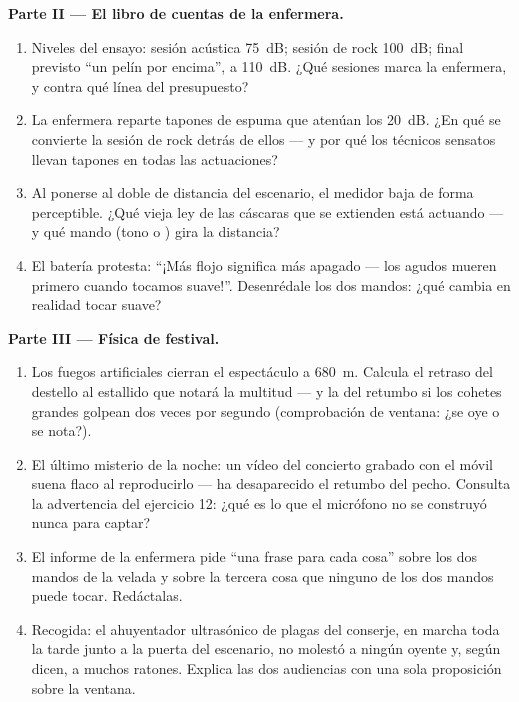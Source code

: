 \begin{problem}
\medskip\noindent\textbf{Parte II --- El libro de cuentas de la
enfermera.}
\begin{enumerate}[resume]
  \item Niveles del ensayo: sesión acústica \qty{75}{dB}; sesión de
        rock \qty{100}{dB}; final previsto ``un pelín por encima'',
        a \qty{110}{dB}. ¿Qué sesiones marca la enfermera, y contra
        qué línea del presupuesto?
  \item La enfermera reparte tapones de espuma que atenúan los
         \qty{20}{dB}. ¿En qué se convierte la sesión de
        rock detrás de ellos --- y por qué los técnicos sensatos
        llevan tapones en todas las actuaciones?
  \item Al ponerse al doble de distancia del escenario, el medidor
        baja de forma perceptible. ¿Qué vieja ley de las cáscaras
        que se extienden está actuando --- y qué mando (tono o
        ) gira la distancia?
  \item El batería protesta: ``¡Más flojo significa más apagado ---
        los agudos mueren primero cuando tocamos suave!''. Desenrédale
        los dos mandos: ¿qué cambia en realidad tocar suave?
\end{enumerate}

\medskip\noindent\textbf{Parte III --- Física de festival.}
\begin{enumerate}[resume]
  \item Los fuegos artificiales cierran el espectáculo a
        \qty{680}{m}. Calcula el retraso del destello al estallido
        que notará la multitud --- y la  del retumbo
        si los cohetes grandes golpean dos veces por segundo
        (comprobación de ventana: ¿se oye o se nota?).
  \item El último misterio de la noche: un vídeo del concierto
        grabado con el móvil suena flaco al reproducirlo --- ha
        desaparecido el retumbo del pecho. Consulta la advertencia
        del ejercicio 12: ¿qué es lo que el micrófono no se
        construyó nunca para captar?
  \item El informe de la enfermera pide ``una frase para cada
        cosa'' sobre los dos mandos de la velada y sobre la tercera
        cosa que ninguno de los dos mandos puede tocar. Redáctalas.
  \item Recogida: el ahuyentador ultrasónico de plagas del
        conserje, en marcha toda la tarde junto a la puerta del
        escenario, no molestó a ningún oyente y, según dicen, a
        muchos ratones. Explica las dos audiencias con una sola
        proposición sobre la ventana.
\end{enumerate}
\end{problem}

